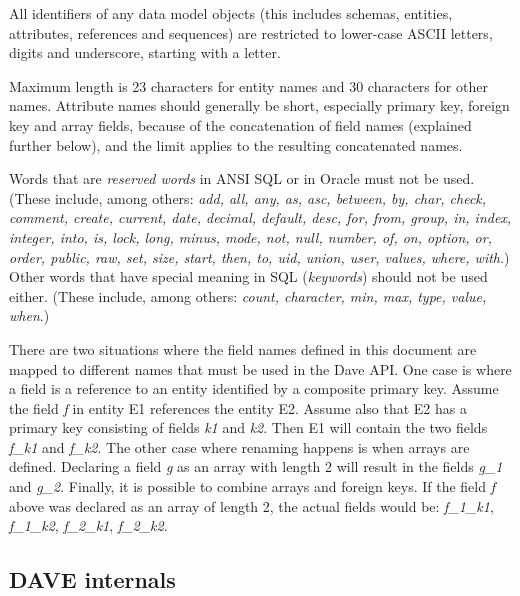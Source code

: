 \documentclass[techdoc]{nobs}   %
\begin{document}
All identifiers of any data model objects (this includes schemas, entities,
attributes, references and sequences) are restricted to
lower-case ASCII letters, digits and underscore, starting with a letter.

Maximum length is 23 characters for entity names
and 30 characters for other names.
Attribute names should
generally be short, especially primary key, foreign key and array fields,
because of the concatenation of field names (explained further below),
and the limit applies to the resulting concatenated names.

Words that are {\em reserved words} in ANSI SQL or in Oracle
must not be used.
(These include, among others: {\it add, all, any, as, asc, between, by,
char, check, comment, create, current, date, decimal, default, desc,
for, from, group, in, index, integer, into, is, lock, long, minus,
mode, not, null, number, of, on, option, or, order, public, raw, set,
size, start, then, to, uid, union, user, values, where, with}.)
Other words that have special meaning in SQL ({\em keywords}) should not be used either.
(These include, among others: {\it count, character, min, max, type, value, when}.)


There are two situations where the field names defined in this document are
mapped to different names that must be used in the Dave API. One case is where
a field is a reference to an entity identified by a composite primary key.
Assume the field {\it f} in entity E1 references the entity E2. Assume also
that E2 has a primary key consisting of fields {\it k1} and {\it k2}. Then E1
will contain the two fields {\it f\_k1} and {\it f\_k2}. The other case where
renaming happens is when arrays are defined. Declaring a field {\it g} as an
array with length 2 will result in the fields {\it g\_1} and {\it g\_2}. Finally,
it is possible to combine arrays and foreign keys. If the field {\it f} above
was declared as an array of length 2, the actual fields would be: {\it f\_1\_k1},
{\it f\_1\_k2}, {\it f\_2\_k1}, {\it f\_2\_k2}.

\subsection{DAVE internals}
\label{sec:Dave internals}
\end{document}
